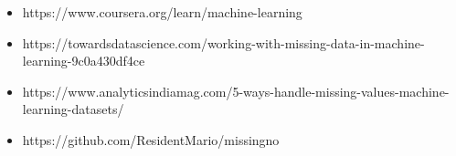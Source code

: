 \documentclass[11pt]{article}
\providecommand{\tightlist}{%
      \setlength{\itemsep}{0pt}\setlength{\parskip}{0pt}}
\begin{document}
    \begin{itemize}
\tightlist
\item
  https://www.coursera.org/learn/machine-learning
\item
  https://towardsdatascience.com/working-with-missing-data-in-machine-learning-9c0a430df4ce\\
\item
  https://www.analyticsindiamag.com/5-ways-handle-missing-values-machine-learning-datasets/
\item
  https://github.com/ResidentMario/missingno
\end{itemize}


    
    
    
    
\end{document}
